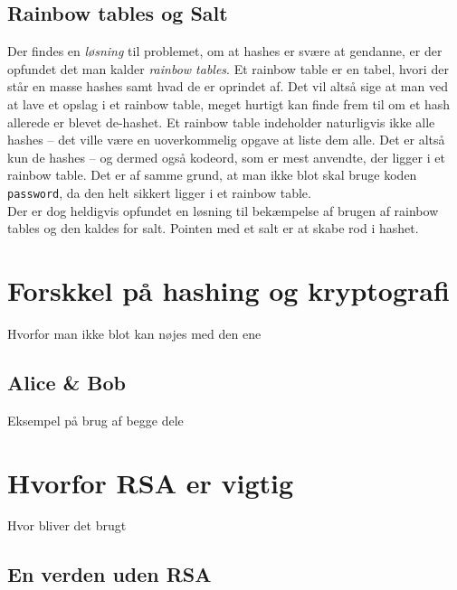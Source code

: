 \documentclass[a4paper, 12pt]{article}
\theoremstyle{break}
\theoremstyle{breakline}
\begin{document}
    \subsection{Rainbow tables og Salt}
    Der findes en \textit{løsning} til problemet, om at hashes er svære at gendanne, er der opfundet det man kalder \emph{rainbow tables}.
    Et rainbow table er en tabel, hvori der står en masse hashes samt hvad de er oprindet af.
    Det vil altså sige at man ved at lave et opslag i et rainbow table, meget hurtigt kan finde frem til om et hash allerede er blevet de-hashet.
    Et rainbow table indeholder naturligvis ikke alle hashes -- det ville være en uoverkommelig opgave at liste dem alle.
    Det er altså kun de hashes -- og dermed også kodeord, som er mest anvendte, der ligger i et rainbow table.
    Det er af samme grund, at man ikke blot skal bruge koden \texttt{password}, da den helt sikkert ligger i et rainbow table.
    \\

    Der er dog heldigvis opfundet en løsning til bekæmpelse af brugen af rainbow tables og den kaldes for salt.
    Pointen med et salt er at skabe rod i hashet.







\newpage
\section{Forskkel på hashing og kryptografi}
Hvorfor man ikke blot kan nøjes med den ene

    \subsection{Alice \& Bob}
    Eksempel på brug af begge dele



\newpage
\section{Hvorfor RSA er vigtig}
Hvor bliver det brugt

    \subsection{En verden uden RSA}





\newpage
\nocite{*}
\setlength\bibitemsep{10pt}
\printbibliography[
heading=bibintoc, %
title={Litteratur} %
]
\end{document}
